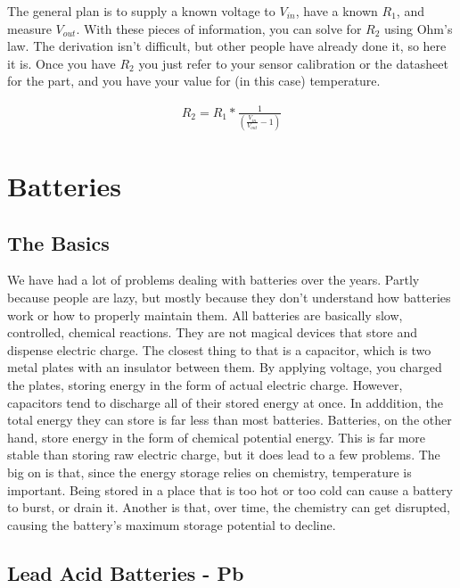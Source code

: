 The general plan is to supply a known voltage to $V_{in}$, have a known $R_1$, and measure $V_{out}$. With these pieces of information, you can solve for $R_2$ using Ohm's law. The derivation isn't difficult, but other people have already done it, so here it is. Once you have $R_2$ you just refer to your sensor calibration or the datasheet for the part, and you have your value for (in this case) temperature.

\begin{equation} \label{eqn:solveforr}
\begin{split}
R_2 = R_1*\frac{1}{(\frac{V_{in}}{V_{out}}-1)}
\end{split}
\end{equation}

\section{Batteries}

\subsection{The Basics}

We have had a lot of problems dealing with batteries over the years. Partly because people are lazy, but mostly because they don't understand how batteries work or how to properly maintain them. All batteries are basically slow, controlled, chemical reactions. They are not magical devices that store and dispense electric charge. The closest thing to that is a capacitor, which is two metal plates with an insulator between them. By applying voltage, you charged the plates, storing energy in the form of actual electric charge. However, capacitors tend to discharge all of their stored energy at once. In adddition, the total energy they can store is far less than most batteries. Batteries, on the other hand, store energy in the form of chemical potential energy. This is far more stable than storing raw electric charge, but it does lead to a few problems. The big on is that, since the energy storage relies on chemistry, temperature is important. Being stored in a place that is too hot or too cold can cause a battery to burst, or drain it. Another is that, over time, the chemistry can get disrupted, causing the battery's maximum storage potential to decline.

\subsection{Lead Acid Batteries - Pb}

